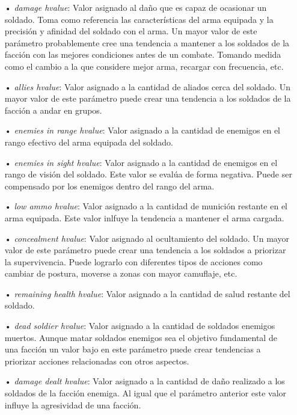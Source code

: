 \documentclass[twoside]{article}
\begin{document}
\begin{itemize}
	\item[•] \emph{damage hvalue}: Valor asignado al da\~no que es capaz de ocasionar un soldado. Toma como referencia las caracter\'isticas del arma equipada y la precisi\'on y afinidad del soldado con el arma. Un mayor valor de este par\'ametro probablemente cree una tendencia a mantener a los soldados de la facci\'on con las mejores condiciones antes de un combate. Tomando medida como el cambio a la que considere mejor arma, recargar con frecuencia, etc.
	\item[•] \emph{allies hvalue}: Valor asignado a la cantidad de aliados cerca del soldado. Un mayor valor de este par\'ametro
	puede crear una tendencia a los soldados de la facci\'on a andar en grupos.
	\item[•] \emph{enemies in range hvalue}: Valor asignado a la cantidad de enemigos en el rango efectivo del arma equipada del soldado.
	\item[•] \emph{enemies in sight hvalue}: Valor asignado a la cantidad de enemigos en el rango de visi\'on del soldado. Este valor se eval\'ua de forma negativa. Puede ser compensado por los enemigos dentro del rango del arma.
	\item[•] \emph{low ammo hvalue}: Valor asignado a la cantidad de munici\'on restante en el arma equipada. Este valor inlfuye la tendencia a mantener el arma cargada.
	\item[•] \emph{concealment hvalue}: Valor asignado al ocultamiento del soldado. Un mayor valor de este par\'ametro puede crear una tendencia a los soldados a priorizar la supervivencia. Puede lograrlo con diferentes tipos de acciones como cambiar de postura, moverse a zonas con mayor camuflaje, etc.
	\item[•] \emph{remaining health hvalue}: Valor asignado a la cantidad de salud restante del soldado.
	\item[•] \emph{dead soldier hvalue}: Valor asignado a la cantidad de soldados enemigos muertos. Aunque matar soldados enemigos sea el objetivo fundamental de una facci\'on un valor bajo en este par\'ametro puede crear tendencias a priorizar acciones relacionadas con otros aspectos.
	\item[•] \emph{damage dealt hvalue}: Valor asignado a la cantidad de da\~no realizado a los soldados de la facci\'on enemiga. Al igual que el par\'ametro anterior este valor influye la agresividad de una facci\'on.
	
\end{itemize}
\end{document}
